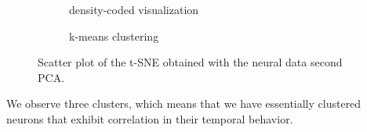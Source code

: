 \begin{figure}[htbp]
	\begin{subfigure}{.49\textwidth}
		\begin{center}
			
			\caption{density-coded visualization}
		\end{center}
	\end{subfigure}
	\begin{subfigure}{.49\textwidth}
		\begin{center}
			
			\caption{k-means clustering}
		\end{center}
	\end{subfigure}
	\caption{Scatter plot of the t-SNE obtained with the neural data second PCA.}
	\label{fig::neural_data_tsne2_scatter}
\end{figure}

We observe three clusters, which means that we have essentially clustered neurons that exhibit correlation in their temporal behavior.

\newpage
